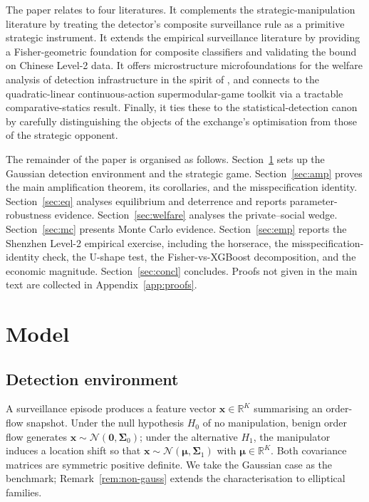 \documentclass[11pt,a4paper]{article}
\theoremstyle{definition}
\theoremstyle{remark}
\newcommand{\R}{\mathbb{R}}
\newcommand{\1}{\mathbf{1}}
\newcommand{\x}{\mathbf{x}}
\newcommand{\mmu}{\boldsymbol{\mu}}
\newcommand{\Sig}{\boldsymbol{\Sigma}}
\begin{document}
The paper relates to four literatures. It complements the strategic-manipulation literature \citep{kyle1985continuous,vila1989simple,allen1992stock,jarrow1992market,kumar1992futures,huberman2004price,goldstein2008manipulation} by treating the detector's composite surveillance rule as a primitive strategic instrument. It extends the empirical surveillance literature \citep{cumming2008global,cumming2011exchange,comerton2014stock,putnins2012market,aggarwal2006stock,dhawan2021new,james2023machine,khomyn2021algos,griffin2020bitcoin} by providing a Fisher-geometric foundation for composite classifiers and validating the bound on Chinese Level-2 data. It offers microstructure microfoundations for the welfare analysis of detection infrastructure in the spirit of \citet{xiong2024information}, and connects to the quadratic-linear continuous-action supermodular-game toolkit \citep{fudenberg1991game,myerson1991game} via a tractable comparative-statics result. Finally, it ties these to the statistical-detection canon \citep{fisher1936use,vantrees1968detection,kay1998fundamentals,poor1994introduction,hasbrouck1991measuring} by carefully distinguishing the objects of the exchange's optimisation from those of the strategic opponent.

The remainder of the paper is organised as follows. Section~\ref{sec:model} sets up the Gaussian detection environment and the strategic game. Section~\ref{sec:amp} proves the main amplification theorem, its corollaries, and the misspecification identity. Section~\ref{sec:eq} analyses equilibrium and deterrence and reports parameter-robustness evidence. Section~\ref{sec:welfare} analyses the private--social wedge. Section~\ref{sec:mc} presents Monte Carlo evidence. Section~\ref{sec:emp} reports the Shenzhen Level-2 empirical exercise, including the horserace, the misspecification-identity check, the U-shape test, the Fisher-vs-XGBoost decomposition, and the economic magnitude. Section~\ref{sec:concl} concludes. Proofs not given in the main text are collected in Appendix~\ref{app:proofs}.

\section{Model}
\label{sec:model}

\subsection{Detection environment}
A surveillance episode produces a feature vector $\x\in\R^K$ summarising an order-flow snapshot. Under the null hypothesis $H_0$ of no manipulation, benign order flow generates $\x\sim\mathcal{N}(\mathbf{0},\Sig_0)$; under the alternative $H_1$, the manipulator induces a location shift so that $\x\sim\mathcal{N}(\mmu,\Sig_1)$ with $\mmu\in\R^K$. Both covariance matrices are symmetric positive definite. We take the Gaussian case as the benchmark; Remark~\ref{rem:non-gauss} extends the characterisation to elliptical families.
\end{document}
